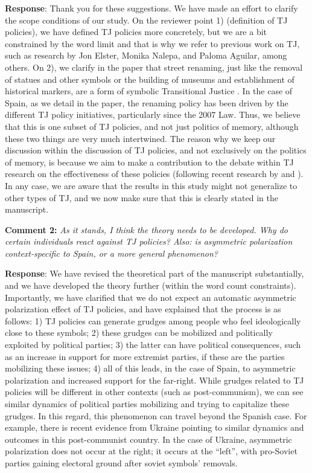 \documentclass[12pt, a4paper, notitlepage]{article}
\begin{document}
\textbf{Response}: Thank you for these suggestions. We have made an effort to clarify the scope conditions of our study. On the reviewer point 1) (definition of TJ policies), we have defined TJ policies more concretely, but we are a bit constrained by the word limit and that is why we refer to previous work on TJ, such as research by Jon Elster, Monika Nalepa, and Paloma Aguilar, among others. On 2), we clarify in the paper that street renaming, just like the removal of statues and other symbols or the building of museums and establishment of historical markers, are a form of symbolic Transitional Justice \citep{Ward2021}. In the case of Spain, as we detail in the paper, the renaming policy has been driven by the different TJ policy initiatives, particularly since the 2007 Law. Thus, we believe that this is one subset of TJ policies, and not just politics of memory, although these two things are very much intertwined. The reason why we keep our discussion within the discussion of TJ policies, and not exclusively on the politics of memory, is because we aim to make a contribution to the debate within TJ research on the effectiveness of these policies (following recent research by \citet{Capoccia:2020aa} and \citet{Balcells:2020aa}). In any case, we are aware that the results in this study might not generalize to other types of TJ, and we now make sure that this is clearly stated in the manuscript.

\textbf{Comment 2:} \textit{As it stands, I think the theory needs to be developed. Why do certain individuals react against TJ policies? Also: is asymmetric polarization context-specific to Spain, or a more general phenomenon?}

\textbf{Response}: We have revised the theoretical part of the manuscript substantially, and we have developed the theory further (within the word count constraints). Importantly, we have clarified that we do not expect an automatic asymmetric polarization effect of TJ policies, and have explained that the process is as follows: 1) TJ policies can generate grudges among people who feel ideologically close to these symbols; 2) these grudges can be mobilized and politically exploited by political parties; 3) the latter can have political consequences, such as an increase in support for more extremist parties, if these are the parties mobilizing these issues; 4) all of this leads, in the case of Spain, to asymmetric polarization and increased support for the far-right. While grudges related to TJ policies will be different in other contexts (such as post-communism), we can see similar dynamics of political parties mobilizing and trying to capitalize these grudges. In this regard, this phenomenon can travel beyond the Spanish case. For example, there is recent evidence from Ukraine \citep{Rozenas:2021} pointing to similar dynamics and outcomes in this post-communist country. In the case of Ukraine, asymmetric polarization does not occur at the right; it occurs at the ``left'', with pro-Soviet parties gaining electoral ground after soviet symbols' removals.
\end{document}
